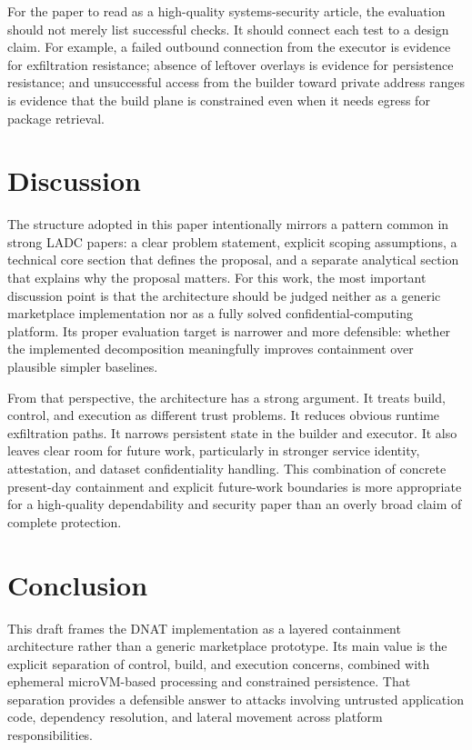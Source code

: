 \documentclass[sigconf,nonacm]{acmart}
\begin{document}
For the paper to read as a high-quality systems-security article, the evaluation should not merely list successful checks. It should connect each test to a design claim. For example, a failed outbound connection from the executor is evidence for exfiltration resistance; absence of leftover overlays is evidence for persistence resistance; and unsuccessful access from the builder toward private address ranges is evidence that the build plane is constrained even when it needs egress for package retrieval.

\section{Discussion}

The structure adopted in this paper intentionally mirrors a pattern common in strong LADC papers: a clear problem statement, explicit scoping assumptions, a technical core section that defines the proposal, and a separate analytical section that explains why the proposal matters. For this work, the most important discussion point is that the architecture should be judged neither as a generic marketplace implementation nor as a fully solved confidential-computing platform. Its proper evaluation target is narrower and more defensible: whether the implemented decomposition meaningfully improves containment over plausible simpler baselines.

From that perspective, the architecture has a strong argument. It treats build, control, and execution as different trust problems. It reduces obvious runtime exfiltration paths. It narrows persistent state in the builder and executor. It also leaves clear room for future work, particularly in stronger service identity, attestation, and dataset confidentiality handling. This combination of concrete present-day containment and explicit future-work boundaries is more appropriate for a high-quality dependability and security paper than an overly broad claim of complete protection.

\section{Conclusion}

This draft frames the DNAT implementation as a layered containment architecture rather than a generic marketplace prototype. Its main value is the explicit separation of control, build, and execution concerns, combined with ephemeral microVM-based processing and constrained persistence. That separation provides a defensible answer to attacks involving untrusted application code, dependency resolution, and lateral movement across platform responsibilities.
\end{document}
